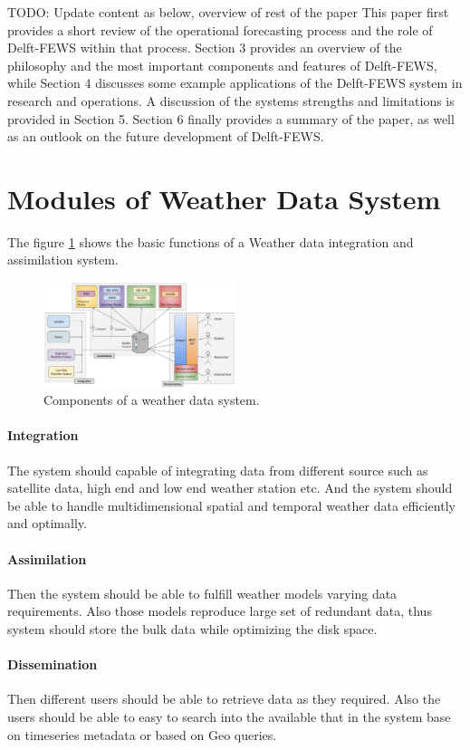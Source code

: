 \documentclass[conference]{IEEEtran}
\begin{document}
TODO: Update content as below, overview of rest of the paper
This paper first provides a short review of the operational forecasting process and the role of Delft-FEWS within that process. Section 3 provides an overview of the philosophy and the most important components and features of Delft-FEWS, while Section 4 discusses some example applications of the Delft-FEWS system in research and operations. A discussion of the systems strengths and limitations is provided in Section 5. Section 6 finally provides a summary of the paper, as well as an outlook on the future development of Delft-FEWS.
\section{Modules of Weather Data System}
The figure \ref{fi:wdia_components} shows the basic functions of a Weather data integration and assimilation system.
\begin{figure}[htbp]
\centerline{\includegraphics[width=0.5\textwidth]{method/misc/weather_data_system_components.jpg}}
\caption{Components of a weather data system.}
\label{fi:wdia_components}
\end{figure}
\paragraph{Integration} The system should capable of integrating data from different source such as satellite data, high end and low end weather station etc. And the system should be able to handle multidimensional spatial and temporal weather data efficiently and optimally. 
\paragraph{Assimilation} Then the system should be able to fulfill weather models varying data requirements. Also those models reproduce large set of redundant data, thus system should store the bulk data while optimizing the disk space.
\paragraph{Dissemination} Then different users should be able to retrieve data as they required. Also the users should be able to easy to search into the available that in the system base on timeseries metadata or based on Geo queries.
\end{document}
